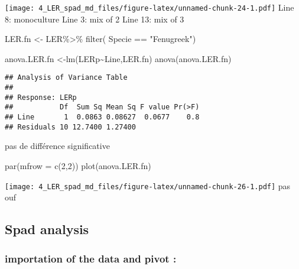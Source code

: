 \documentclass[
]{article}
\newenvironment{Shaded}{\begin{snugshade}}{\end{snugshade}}
\newcommand{\AttributeTok}[1]{\textcolor[rgb]{0.77,0.63,0.00}{#1}}
\newcommand{\DecValTok}[1]{\textcolor[rgb]{0.00,0.00,0.81}{#1}}
\newcommand{\FunctionTok}[1]{\textcolor[rgb]{0.00,0.00,0.00}{#1}}
\newcommand{\NormalTok}[1]{#1}
\newcommand{\OtherTok}[1]{\textcolor[rgb]{0.56,0.35,0.01}{#1}}
\newcommand{\SpecialCharTok}[1]{\textcolor[rgb]{0.00,0.00,0.00}{#1}}
\newcommand{\StringTok}[1]{\textcolor[rgb]{0.31,0.60,0.02}{#1}}
\begin{document}
\texttt{[image: 4\_LER\_spad\_md\_files/figure-latex/unnamed-chunk-24-1.pdf]}
Line 8: monoculture Line 3: mix of 2 Line 13: mix of 3

\begin{Shaded}
\begin{Highlighting}[]
\NormalTok{LER.fn }\OtherTok{\textless{}{-}}\NormalTok{ LER}\SpecialCharTok{\%\textgreater{}\%}
  \FunctionTok{filter}\NormalTok{( Specie }\SpecialCharTok{==} \StringTok{"Fenugreek"}\NormalTok{)}

\NormalTok{anova.LER.fn }\OtherTok{\textless{}{-}}\FunctionTok{lm}\NormalTok{(LERp}\SpecialCharTok{\textasciitilde{}}\NormalTok{Line,LER.fn)}
\FunctionTok{anova}\NormalTok{(anova.LER.fn)}
\end{Highlighting}
\end{Shaded}

\begin{verbatim}
## Analysis of Variance Table
## 
## Response: LERp
##           Df  Sum Sq Mean Sq F value Pr(>F)
## Line       1  0.0863 0.08627  0.0677    0.8
## Residuals 10 12.7400 1.27400
\end{verbatim}

pas de différence significative

\begin{Shaded}
\begin{Highlighting}[]
\FunctionTok{par}\NormalTok{(}\AttributeTok{mfrow =} \FunctionTok{c}\NormalTok{(}\DecValTok{2}\NormalTok{,}\DecValTok{2}\NormalTok{))}
\FunctionTok{plot}\NormalTok{(anova.LER.fn)}
\end{Highlighting}
\end{Shaded}

\texttt{[image: 4\_LER\_spad\_md\_files/figure-latex/unnamed-chunk-26-1.pdf]}
pas ouf

\hypertarget{spad-analysis}{%
\subsection{Spad analysis}\label{spad-analysis}}

\hypertarget{importation-of-the-data-and-pivot}{%
\subsubsection{importation of the data and pivot
:}\label{importation-of-the-data-and-pivot}}
\end{document}
